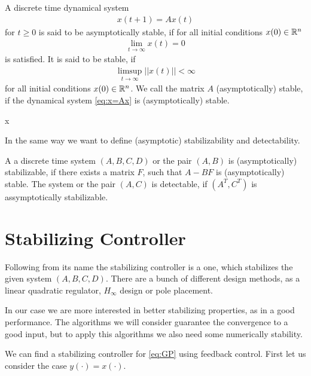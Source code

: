 \begin{defi}
	A discrete time dynamical system
	\begin{align}
	\label{eq:x=Ax}
	x(t+1) = A x(t)
	\end{align}
	for $t \geq 0$ 
	is said to be asymptotically stable, if for all initial conditions $x(0) \in {\mathbb{R}}^n$
	\begin{align}
	\lim_{t \to \infty} x(t) = 0
	\end{align}	
    is satisfied. 
	It is said to be stable, if 
	\begin{align}
	\limsup_{t \to \infty} ||x(t)|| < \infty
	\end{align}
	for all	 initial conditions $x(0) \in {\mathbb{R}}^n$.
	We call the matrix $A$ (asymptotically) stable, if the dynamical system \eqref{eq:x=Ax} is (asymptotically) stable.
\end{defi}


x


In the same way we want to define (asymptotic) stabilizability and detectability. 
\begin{defi}
A a discrete time system $(A, B, C, D)$ or the pair $(A, B)$ is (asymptotically) stabilizable, if there exists a matrix $F$, such that $A - BF$ is (asymptotically) stable.
The system or the pair $(A,C)$ is detectable, if $(A^T, C^T)$ is assymptotically stabilizable. 
\end{defi}



\section{Stabilizing Controller}
\label{sch:stabilizingController}

Following from its name the stabilizing controller is a one, which stabilizes the given system $(A,B,C,D)$. There are a bunch of different design methods, as a linear quadratic regulator, $H_\infty$ design or pole placement. 

In our case we are more interested in better stabilizing properties, as in a good performance. The algorithms we will consider guarantee the convergence to a good input, but to apply this algorithms we also need some numerically stability. 

We can find a stabilizing controller for \eqref{eq:GP} using feedback control.
First let us consider the case $y(\cdot) = x(\cdot)$.

%
%


